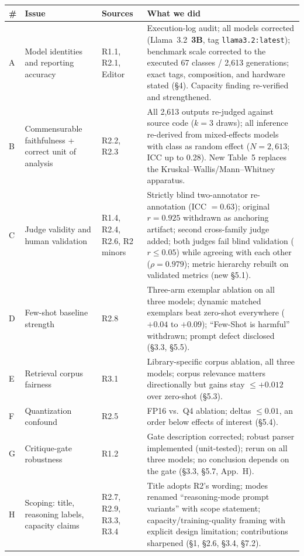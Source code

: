 \documentclass[11pt]{article}
\begin{document}
\begin{center}
\small
\begin{tabular}{p{0.4cm}p{3.6cm}p{2.4cm}p{7.6cm}}
\toprule
\# & \textbf{Issue} & \textbf{Sources} & \textbf{What we did} \\
\midrule
A & Model identities and reporting accuracy & R1.1, R2.1, Editor & Execution-log audit; all models corrected (Llama~3.2~\textbf{3B}, tag \texttt{llama3.2:latest}); benchmark scale corrected to the executed 67 classes / 2{,}613 generations; exact tags, composition, and hardware stated (\S4). Capacity finding re-verified and strengthened. \\
B & Commensurable faithfulness + correct unit of analysis & R2.2, R2.3 & All 2{,}613 outputs re-judged against source code ($k{=}3$ draws); all inference re-derived from mixed-effects models with class as random effect ($N{=}2{,}613$; ICC up to 0.28). New Table~5 replaces the Kruskal--Wallis/Mann--Whitney apparatus. \\
C & Judge validity and human validation & R1.4, R2.4, R2.6, R2 minors & Strictly blind two-annotator re-annotation (ICC $=0.63$); original $r{=}0.925$ withdrawn as anchoring artifact; second cross-family judge added; both judges fail blind validation ($r\le0.05$) while agreeing with each other ($\rho=0.979$); metric hierarchy rebuilt on validated metrics (new \S5.1). \\
D & Few-shot baseline strength & R2.8 & Three-arm exemplar ablation on all three models; dynamic matched exemplars beat zero-shot everywhere ($+0.04$ to $+0.09$); ``Few-Shot is harmful'' withdrawn; prompt defect disclosed (\S3.3, \S5.5). \\
E & Retrieval corpus fairness & R3.1 & Library-specific corpus ablation, all three models; corpus relevance matters directionally but gains stay $\le +0.012$ over zero-shot (\S5.3). \\
F & Quantization confound & R2.5 & FP16 vs.\ Q4 ablation; deltas $\le 0.01$, an order below effects of interest (\S5.4). \\
G & Critique-gate robustness & R1.2 & Gate description corrected; robust parser implemented (unit-tested); rerun on all three models; no conclusion depends on the gate (\S3.3, \S5.7, App.~H). \\
H & Scoping: title, reasoning labels, capacity claims & R2.7, R2.9, R3.3, R3.4 & Title adopts R2's wording; modes renamed ``reasoning-mode prompt variants'' with scope statement; capacity/training-quality framing with explicit design limitation; contributions sharpened (\S1, \S2.6, \S3.4, \S7.2). \\

\end{tabular}
\end{center}
\end{document}
